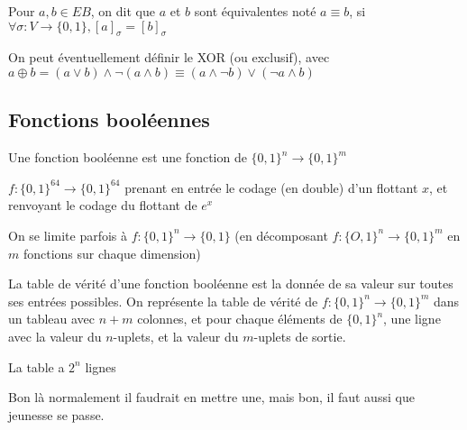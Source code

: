 \begin{definition}
	Pour $a, b \in EB$, on dit que $a$ et $b$ sont équivalentes noté $a \equiv b$, si $\forall \sigma :V \to \{0,1\}, [a]_\sigma = [b]_\sigma$
\end{definition}

\begin{definition}
	On peut éventuellement définir le XOR (ou exclusif), avec $a\oplus b = (a\vee b)\wedge \neg(a\wedge b) \equiv (a\wedge \neg b)\vee (\neg a\wedge b)$
\end{definition}

\subsection{Fonctions booléennes}

\label{22-1-2}

\begin{definition}
	Une fonction booléenne est une fonction de $\{0, 1\}^n \to \{0, 1\}^m$
\end{definition}

\begin{example}
	$f : \{0,1\}^{64} \to \{0,1\}^{64}$ prenant en entrée le codage (en double) d'un flottant $x$, et renvoyant le codage du flottant de $e^x$
\end{example}

\begin{rem}
	On se limite parfois à $f : \{0,1\}^n \to \{0, 1\}$ (en décomposant $f : \{O, 1\}^n \to \{0, 1\}^m$ en $m$ fonctions sur chaque dimension)
\end{rem}

\begin{definition}
	La table de vérité d'une fonction booléenne est la donnée de sa valeur sur toutes ses entrées possibles. On représente la table de vérité de $f:\{0,1\}^n \to \{0,1\}^m$ dans un tableau avec $n+m$ colonnes, et pour chaque éléments de $\{0,1\}^n$, une ligne avec la valeur du $n$-uplets, et la valeur du $m$-uplets de sortie.
\end{definition}

\begin{rem}
	La table a $2^n$ lignes
\end{rem}

\begin{com}
	Bon là normalement il faudrait en mettre une, mais bon, il faut aussi que jeunesse se passe.
\end{com}

